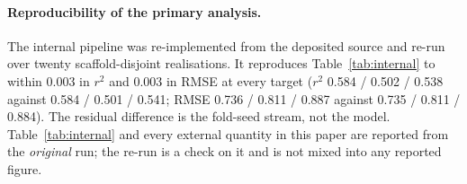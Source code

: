 \documentclass[11pt,a4paper]{article}
\begin{document}
\paragraph{Reproducibility of the primary analysis.}\label{sec:reimplementation} The internal pipeline was
re-implemented from the deposited source and re-run over twenty scaffold-disjoint
realisations. It reproduces Table~\ref{tab:internal} to within 0.003 in $r^{2}$ and
0.003 in RMSE at every target ($r^{2}$ 0.584 / 0.502 / 0.538 against 0.584 / 0.501 /
0.541; RMSE 0.736 / 0.811 / 0.887 against 0.735 / 0.811 / 0.884). The residual
difference is the fold-seed stream, not the model. Table~\ref{tab:internal} and every
external quantity in this paper are reported from the \emph{original} run; the re-run is
a check on it and is not mixed into any reported figure.
\end{document}
